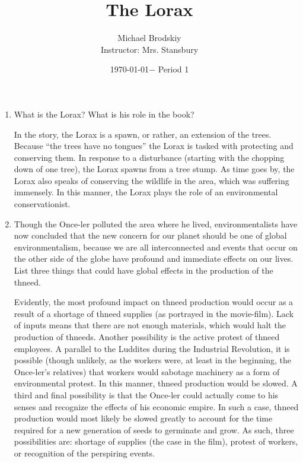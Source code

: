 \documentclass[12pt]{article}
\title{The Lorax}
\date{\today $-$ Period 1}
\author{Michael Brodskiy\\ \small Instructor: Mrs. Stansbury}
\begin{document}
\maketitle

\begin{enumerate}

  \item What is the Lorax? What is his role in the book?

    \begin{justify}

      In the story, the Lorax is a spawn, or rather, an extension of the trees. Because “the trees have no tongues” the Lorax is tasked with protecting and conserving them. In response to a disturbance (starting with the chopping down of one tree), the Lorax spawns from a tree stump. As time goes by, the Lorax also speaks of conserving the wildlife in the area, which was suffering immensely. In this manner, the Lorax plays the role of an environmental conservationist.

    \end{justify}

  \item Though the Once-ler polluted the area where he lived, environmentalists have now concluded that the new concern for our planet should be one of global environmentalism, because we are all interconnected and events that occur on the other side of the globe have profound and immediate effects on our lives. List three things that could have global effects in the production of the thneed.

    \begin{justify}

      Evidently, the most profound impact on thneed production would occur as a result of a shortage of thneed supplies (as portrayed in the movie-film). Lack of inputs means that there are not enough materials, which would halt the production of thneeds. Another possibility is the active protest of thneed employees. A parallel to the Luddites during the Industrial Revolution, it is possible (though unlikely, as the workers were, at least in the beginning, the Once-ler's relatives) that workers would sabotage machinery as a form of environmental protest. In this manner, thneed production would be slowed. A third and final possibility is that the Once-ler could actually come to his senses and recognize the effects of his economic empire. In such a case, thneed production would most likely be slowed greatly to account for the time required for a new generation of seeds to germinate and grow. As such, three possibilities are: shortage of supplies (the case in the film), protest of workers, or recognition of the perspiring events.
      

\end{justify}
\end{enumerate}
\end{document}
